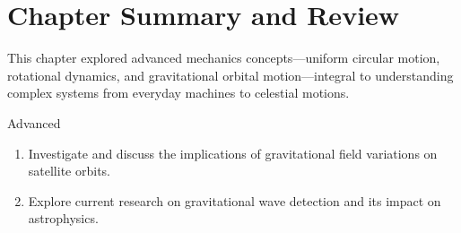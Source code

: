 \FloatBarrier

\section{Chapter Summary and Review}
\FloatBarrier

This chapter explored advanced mechanics concepts—uniform circular motion, rotational dynamics, and gravitational orbital motion—integral to understanding complex systems from everyday machines to celestial motions.


\begin{tieredquestions}{Advanced}
\begin{enumerate}
  \item Investigate and discuss the implications of gravitational field variations on satellite orbits.
  \item Explore current research on gravitational wave detection and its impact on astrophysics.
\end{enumerate}
\end{tieredquestions}